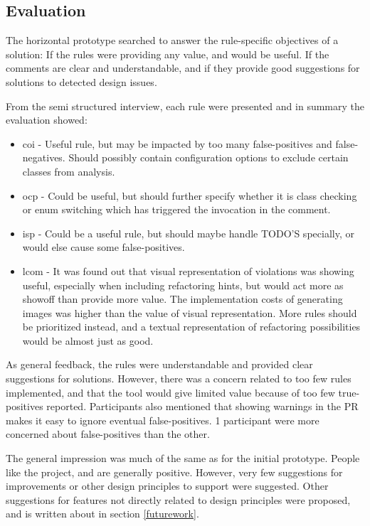 \documentclass{report}
\begin{document}
\subsection*{Evaluation}

The horizontal prototype searched to answer the rule-specific objectives of a solution: If the rules were providing any value, and would be useful. If the comments are clear and understandable, and if they provide good suggestions for solutions to detected design issues. 

From the semi structured interview, each rule were presented and in summary the evaluation showed:
\begin{itemize}
    \item \gls{coi} - Useful rule, but may be impacted by too many false-positives and false-negatives. Should possibly contain configuration options to exclude certain classes from analysis.
\item \gls{ocp} - Could be useful, but should further specify whether it is class checking or enum switching which has triggered the invocation in the comment. 
\item \gls{isp} - Could be a useful rule, but should maybe handle TODO'S specially, or would else cause some false-positives.
\item \gls{lcom} - It was found out that visual representation of violations was showing useful, especially when including refactoring hints, but would act more as showoff than provide more value. The implementation costs of generating images was higher than the value of visual representation. More rules should be prioritized instead, and a textual representation of refactoring possibilities would be almost just as good.
\end{itemize}

As general feedback, the rules were understandable and provided clear suggestions for solutions. However, there was a concern related to too few rules implemented, and that the tool would give limited value because of too few true-positives reported. Participants also mentioned that showing warnings in the PR makes it easy to ignore eventual false-positives. 1 participant were more concerned about false-positives than the other.

The general impression was much of the same as for the initial prototype. People like the project, and are generally positive. However, very few suggestions for improvements or other design principles to support were suggested. Other suggestions for features not directly related to design principles were proposed, and is written about in section \ref{futurework}.
\end{document}
